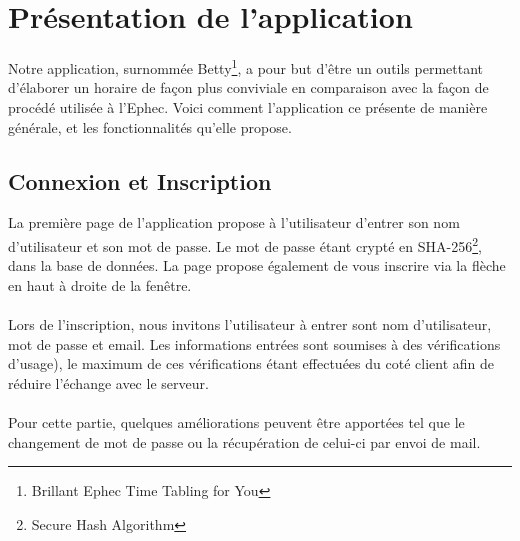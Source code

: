 \section{Présentation de l'application}
Notre application, surnommée Betty\footnote{Brillant Ephec Time Tabling for You}, a pour but d'être un outils permettant d'élaborer un horaire de façon plus conviviale en comparaison avec la façon de procédé utilisée à l'Ephec. Voici comment l'application ce présente de manière générale, et les fonctionnalités qu'elle propose.

\subsection{Connexion et Inscription}

La première page de l'application propose à l'utilisateur d'entrer son nom d'utilisateur et son mot de passe. Le mot de passe étant crypté en SHA-256\footnote{Secure Hash Algorithm}, dans la base de données. La page propose également de vous inscrire via la flèche en haut à droite de la fenêtre.\\
\\
Lors de l'inscription, nous invitons l'utilisateur à entrer sont nom d'utilisateur, mot de passe et email. Les informations entrées sont soumises à des vérifications d'usage), le maximum de ces vérifications étant effectuées du coté client afin de réduire l'échange avec le serveur.\\
\\
Pour cette partie, quelques améliorations peuvent être apportées tel que le changement de mot de passe ou la récupération de celui-ci par envoi de mail.

